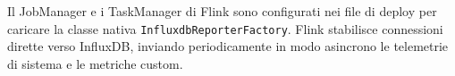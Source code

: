 \documentclass[conference]{IEEEtran}
\begin{document}
Il JobManager e i TaskManager di Flink sono configurati nei file di deploy per caricare la classe nativa \texttt{InfluxdbReporterFactory}. Flink stabilisce connessioni dirette verso InfluxDB, inviando periodicamente in modo asincrono le telemetrie di sistema e le metriche custom. %

\end{document}
